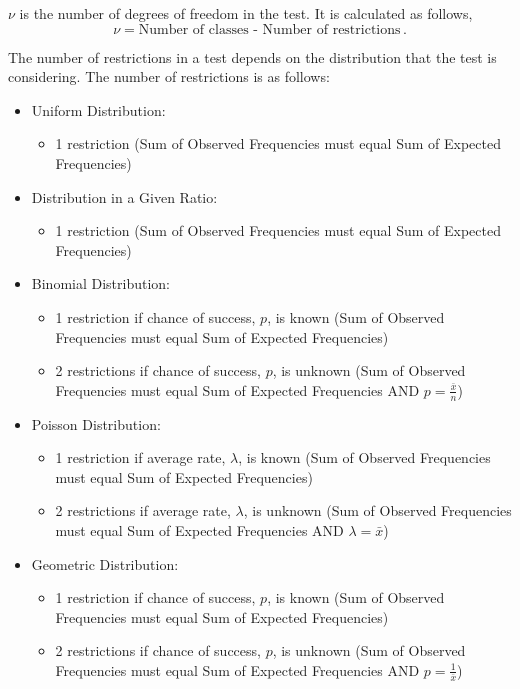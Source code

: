 \begin{note}
	$\nu$ is the number of degrees of freedom in the test. It is calculated as follows,
	\begin{equation}
		\nu = \text{Number of classes - Number of restrictions} \,.
	\end{equation}

The number of restrictions in a test depends on the distribution that the test is considering. The number of restrictions is as follows:
\begin{itemize}
	\item Uniform Distribution:
	\begin{itemize}
		\item 1 restriction (Sum of Observed Frequencies must equal Sum of Expected Frequencies)
	\end{itemize} 
	\item Distribution in a Given Ratio: 
	\begin{itemize} 
		\item 1 restriction (Sum of Observed Frequencies must equal Sum of Expected Frequencies)
	\end{itemize}
	\item Binomial Distribution:
	\begin{itemize}
		\item 1 restriction if chance of success, $p$, is known (Sum of Observed Frequencies must equal Sum of Expected Frequencies)
		\item 2 restrictions if chance of success, $p$, is unknown (Sum of Observed Frequencies must equal Sum of Expected Frequencies AND $p=\frac{\bar{x}}{n}$)
	\end{itemize}
	\item Poisson Distribution:
	\begin{itemize}
		\item 1 restriction if average rate, $\lambda$, is known (Sum of Observed Frequencies must equal Sum of Expected Frequencies)
		\item 2 restrictions if average rate, $\lambda$, is unknown (Sum of Observed Frequencies must equal Sum of Expected Frequencies AND $\lambda=\bar{x}$)
	\end{itemize}
	\item Geometric Distribution:
	\begin{itemize}
		\item 1 restriction if chance of success, $p$, is known (Sum of Observed Frequencies must equal Sum of Expected Frequencies)
		\item 2 restrictions if chance of success, $p$, is unknown (Sum of Observed Frequencies must equal Sum of Expected Frequencies AND $p=\frac{1}{\bar{x}}$)

\end{itemize}
\end{itemize}
\end{note}
